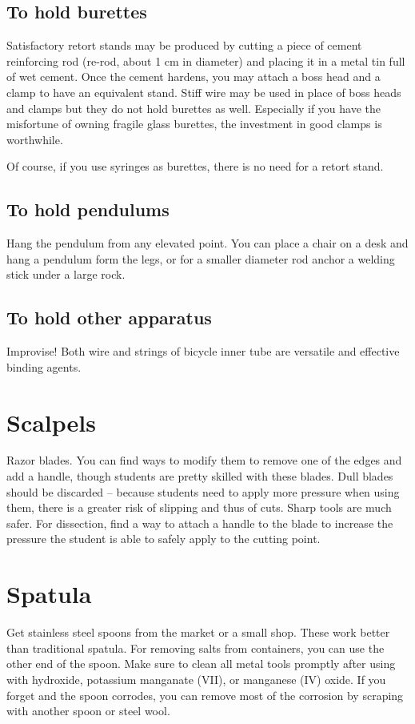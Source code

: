 \subsection{To hold burettes}
Satisfactory retort stands may be produced 
by cutting a piece of cement reinforcing rod (re-rod, 
about 1 cm in diameter) and placing it in a metal tin full of wet cement. 
Once the cement hardens, 
you may attach a boss head and a clamp to have an equivalent stand. 
Stiff wire may be used in place of boss heads and clamps 
but they do not hold burettes as well. 
Especially if you have the misfortune of owning fragile glass burettes, 
the investment in good clamps is worthwhile.

Of course, 
if you use syringes as burettes, 
there is no need for a retort stand.

\subsection{To hold pendulums}
Hang the pendulum from any elevated point. 
You can place a chair on a desk and hang a pendulum form the legs, 
or for a smaller diameter rod anchor a welding stick under a large rock.

\subsection{To hold other apparatus}
Improvise! 
Both wire and strings of bicycle inner tube are versatile 
and effective binding agents.

\section{Scalpels}
Razor blades. 
You can find ways to modify them 
to remove one of the edges and add a handle, 
though students are pretty skilled with these blades. 
Dull blades should be discarded -- 
because students need to apply more pressure when using them, 
there is a greater risk of slipping and thus of cuts. 
Sharp tools are much safer. 
For dissection, 
find a way to attach a handle to the blade 
to increase the pressure 
the student is able to safely apply to the cutting point.

\section{Spatula}
Get stainless steel spoons from the market or a small shop. 
These work better than traditional spatula. 
For removing salts from containers, 
you can use the other end of the spoon. 
Make sure to clean all metal tools promptly after using with hydroxide, 
potassium manganate (VII), 
or manganese (IV) oxide. 
If you forget and the spoon corrodes, 
you can remove most of the corrosion 
by scraping with another spoon or steel wool.

